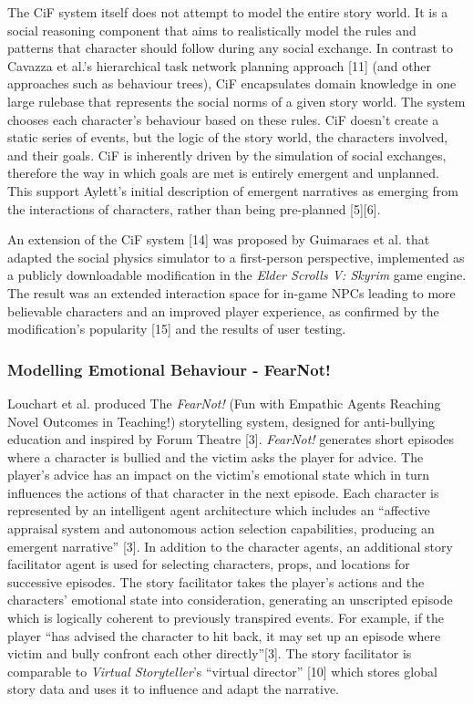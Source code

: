 \documentclass{sig-alternate-05-2015}
\begin{document}
\newline The CiF system itself does not attempt to model the entire story world. It is a social reasoning component that aims to realistically model the rules and patterns that character should follow during any social exchange. In contrast to Cavazza et al.'s hierarchical task network planning approach [11] (and other approaches such as behaviour trees), CiF encapsulates domain knowledge in one large rulebase that represents the social norms of a given story world. The system chooses each character's behaviour based on these rules. CiF doesn't create a static series of events, but the logic of the story world, the characters involved, and their goals. CiF is inherently driven by the simulation of social exchanges, therefore the way in which goals are met is entirely emergent and unplanned. This support Aylett's initial description of emergent narratives as emerging from the interactions of characters, rather than being pre-planned [5][6].

\newline An extension of the CiF system [14] was proposed by Guimaraes et al. that adapted the social physics simulator to a first-person perspective, implemented as a publicly downloadable modification in the \textit{Elder Scrolls V: Skyrim} game engine. The result was an extended interaction space for in-game NPCs leading to more believable characters and an improved player experience, as confirmed by the modification's popularity [15] and the results of user testing.

\subsubsection{Modelling Emotional Behaviour - FearNot!}
Louchart et al. produced The \textit{FearNot!} (Fun with Empathic Agents Reaching Novel Outcomes in Teaching!) storytelling system, designed for anti-bullying education and inspired by Forum Theatre [3]. \textit{FearNot!} generates short episodes where a character is bullied and the victim asks the player for advice. The player's advice has an impact on the victim's emotional state which in turn influences the actions of that character in the next episode. Each character is represented by an intelligent agent architecture which includes an ``affective appraisal system and autonomous action selection capabilities, producing an emergent narrative'' [3]. In addition to the character agents, an additional story facilitator agent is used for selecting characters, props, and locations for successive episodes. The story facilitator takes the player's actions and the characters' emotional state into consideration, generating an unscripted episode which is logically coherent to previously transpired events. For example, if the player ``has advised the character to hit back, it may set up an episode where victim and bully confront each other directly''[3]. The story facilitator is comparable to \textit{Virtual Storyteller}'s ``virtual director'' [10] which stores global story data and uses it to influence and adapt the narrative.
\end{document}

